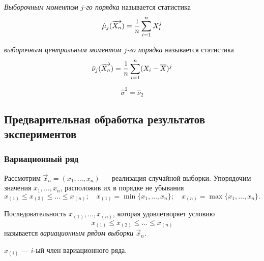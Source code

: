 \begin{defn}
	\emph{Выборочным моментом $j$-го порядка} называется статистика
	\begin{equation}
		\hat{\mu}_j(\overrightarrow{X_n}) = \frac{1}{n} \sum_{i = 1}^{n} X_i^j
	\end{equation}
\end{defn}

\begin{defn}
	\emph{выборочным центральным моментом $j$-го порядка} называется статистика
	\[
		\hat{\nu}_j(\overrightarrow{X_n}) = \frac{1}{n} \sum_{i = 1}^{n} (X_i - \overline{X})^j
	\]
\end{defn}
\begin{rem}
	\begin{equation}
		\hat{\sigma}^2 = \hat{\nu}_2
	\end{equation}
\end{rem}


\subsection{Предварительная обработка результатов экспериментов}

\subsubsection{Вариационный ряд}

Рассмотрим $\vec{x}_n = (x_1, \dots, x_n)$ --- реализация случайной выборки. Упорядочим значения $x_1, \dots, x_n$, расположив их в порядке не убывания
\[
	x_{(1)} \leq x_{(2)} \leq \dots \leq x_{(n)}; \quad x_{(1)} = \min \{ x_1, \dots, x_n \}; \quad x_{(n)} = \max \{ x_1, \dots, x_n \}.
\]

\begin{defn}
	Последовательность $x_{(1)}, \dots, x_{(n)}$, которая удовлетворяет условию 
	\[
		x_{(1)} \leq x_{(2)} \leq \dots \leq x_{(n)}
	\] 
	называется \emph{вариационным рядом выборки $\vec{x}_n$}.
\end{defn}
\begin{rem}
	$x_{(i)}$ --- $i$-ый член вариационного ряда.
\end{rem}


